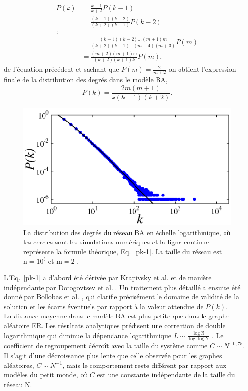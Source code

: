 \begin{align}
P(k)&=\frac{k-1}{k+2}P(k-1)\nonumber\\
&=\frac{(k-1)(k-2)}{(k+2)(k+1)}P(k-2)\nonumber\\
\colon\nonumber\\
&=\frac{(k-1)(k-2)...(m+1)m}{(k+2)(k+1)...(m+4)(m+3)}P(m)\nonumber\\
&=\frac{(m+2)(m+1)m}{(k+2)(k+1)k}P(m),
\end{align}
de l'équation précédent et sachant que $P(m)=\frac{2}{m+2}$ on obtient l'expression finale de la distribution des degrés dans le modèle BA,
\begin{equation}
P(k)=\dfrac{2m(m+1)}{k(k+1)(k+2)}.
\label{pk-1}
\end{equation}
\begin{figure}[h!]
	\centering
	\includegraphics[scale=1]{./figures/fig-barabasi}
	\caption{La distribution des degrés du réseau BA en échelle logarithmique, où les cercles sont les simulations numériques et la ligne continue représente la formule théorique, Eq.~\eqref{pk-1}. La taille du réseau est $\mathrm{n}=10^{6}$ et $\mathrm{m}=2$ .}	
	\label{BA-distribution}
\end{figure}

L'Eq.~\eqref{pk-1} a d'abord été dérivée par Krapivsky et al. \cite{Krapivsky-al2000} et de manière indépendante par Dorogovtsev et al. \cite{Dorogovtsev-al2000-2}. Un traitement plus détaillé a ensuite été donné par Bollobas et al. \cite{Bollobas-Riordan2002}, qui clarifie précisément le domaine de validité de la solution et les écarts éventuels par rapport à la valeur attendue de  $P(k)$.\\ 

La distance moyenne dans le modèle BA est plus petite que dans le graphe aléatoire ER. Les résultats analytiques prédisent une correction de double logarithmique qui diminue la dépendance logarithmique $ L\sim\frac{\log \mathrm{N}}{\log\log\mathrm{N} }$ \cite{Bollobas-Riordan2002}. Le coefficient de regroupement décroît avec la taille du système comme $C\sim N^{-0,75}$. Il s'agit d'une décroissance plus lente que celle observée pour les graphes aléatoires, $C\sim N^{-1}$, mais le comportement reste différent par rapport aux modèles du petit monde, où $C$ est une constante indépendante de la taille du réseau $\mathrm{N}$.

